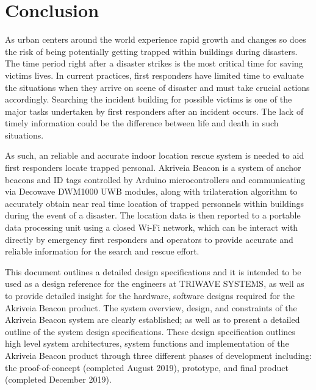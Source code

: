 

\setcounter{section}{6}
\section{Conclusion}

\bigskip
As urban centers around the world experience rapid growth and changes so does the risk of being potentially getting trapped within buildings during disasters. The time period right after a disaster strikes is the most critical time for saving victims lives. In current practices, first responders have limited time to evaluate the situations when they arrive on scene of disaster and must take crucial actions accordingly. Searching the incident building for possible victims is one of the major tasks undertaken by first responders after an incident occurs. The lack of timely information could be the difference between life and death in such situations.

\medskip
As such, an reliable and accurate indoor location rescue system is needed to aid first responders locate trapped personal. Akriveia Beacon is a system of anchor beacons and ID tags controlled by Arduino microcontrollers and communicating via Decowave DWM1000 UWB modules, along with trilateration algorithm to accurately obtain near real time location of trapped personnels within buildings during the event of a disaster. The location data is then reported to a portable data processing unit using a closed Wi-Fi network, which can be interact with directly by emergency first responders and operators to provide accurate and reliable information for the search and rescue effort. 

\medskip
This document outlines a detailed design specifications and it is intended to be used as a design
reference for the engineers at TRIWAVE SYSTEMS, as well as to provide detailed insight for the hardware, software designs required for the Akriveia Beacon product. The system overview, design, and constraints of the Akriveia Beacon system are clearly established; as well as to present a detailed outline of the system design specifications. These design specification outlines high level system architectures, system functions and implementation of the Akriveia Beacon product through three different phases of development including: the proof-of-concept (completed August 2019), prototype, and final product (completed December 2019).


